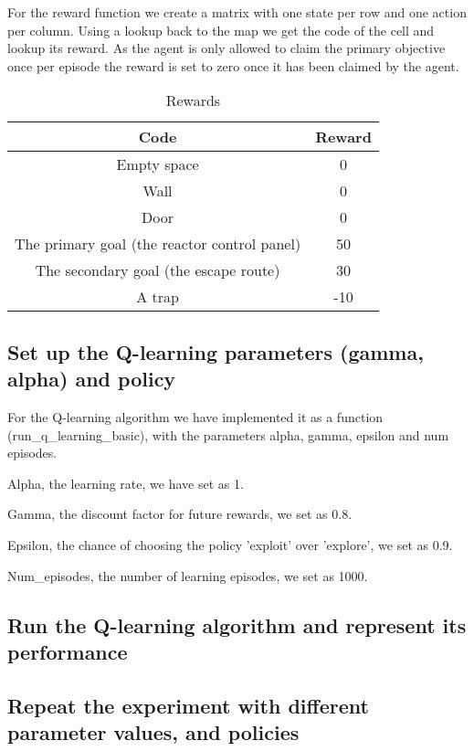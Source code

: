 \documentclass[a4pape, 11pt, english]{article}
\begin{document}
For the reward function we create a matrix with one state per row and one action per column. Using a lookup back to the map we get the code of the cell and lookup its reward. As the agent is only allowed to claim the primary objective once per episode the reward is set to zero once it has been claimed by the agent.

\begin{table}[htbp]
	\begin{center}
		\caption{Rewards}
		\label{tab:table1}
		\begin{tabular}{|c|c|}
			\hline
			\textbf{Code} & \textbf{Reward} \\
			\hline
			Empty space & 0 \\
			\hline
			Wall & 0 \\
			\hline
			Door & 0 \\
			\hline
			The primary goal (the reactor control panel) & 50 \\
			\hline
			The secondary goal (the escape route) & 30 \\
			\hline
			A trap & -10 \\
			\hline
		\end{tabular}
	\end{center}
\end{table}

\subsection{Set up the Q-learning parameters (gamma, alpha) and policy}
For the Q-learning algorithm we have implemented it as a function (run\_q\_learning\_basic), with the parameters alpha, gamma, epsilon and num episodes.

Alpha, the learning rate, we have set as 1.

Gamma, the discount factor for future rewards, we set as 0.8.

Epsilon, the chance of choosing the policy 'exploit' over 'explore', we set as 0.9.

Num\_episodes, the number of learning episodes, we set as 1000.

\subsection{Run the Q-learning algorithm and represent its performance}

\subsection{Repeat the experiment with different parameter values, and policies}
\end{document}
